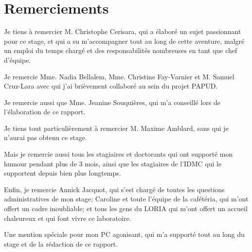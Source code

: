 \maketitle
{}
	
	
\makesecondtitle

\section*{Remerciements}
{
	Je tiens à remercier M. Christophe Cerisara, qui a élaboré un sujet passionnant pour ce stage, et qui a su m'accompagner tout au long de cette aventure, malgré un emploi du temps chargé et des responsabilités nombreuses en tant que chef d'équipe.
	
	Je remercie Mme. Nadia Bellalem, Mme. Christine Fay-Varnier et M. Samuel Cruz-Lara avec qui j'ai brièvement collaboré au sein du projet PAPUD.
	
	Je remercie aussi que Mme. Jeanine Souquières, qui m'a conseillé lors de l'élaboration de ce rapport.
	
	Je tiens tout particulièrement à remercier 
	M. Maxime Amblard, sans qui je n'aurai pas obtenu ce stage.
	
	Mais je remercie aussi tous les stagiaires et doctorants qui ont supporté mon humour pendant plus de 3 mois, ainsi que les stagiaires de l'IDMC qui le supportent depuis bien plus longtemps.
	
	Enfin, je remercie Annick Jacquot, qui s'est chargé de toutes les questions administratives de mon stage; Caroline et toute l'équipe de la cafétéria, qui m'ont offert un cadre inoubliable; et tous les gens du LORIA qui m'ont offert un accueil chaleureux et qui font vivre ce laboratoire.
	
	Une mention spéciale pour mon PC agonisant, qui m'a supporté tout au long du stage et de la rédaction de ce rapport.
}


